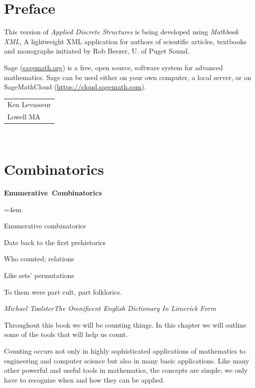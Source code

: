 \documentclass[10pt,]{book}
\theoremstyle{plain}
\theoremstyle{definition}
\theoremstyle{definition}
\theoremstyle{definition}
\newenvironment{poem}{\setlength{\parindent}{0em}}{}
\newcommand{\poemTitle}[1]{\begin{center}\large\textbf{#1}\end{center}}
\newenvironment{stanza}{\vspace{0.25 em}\hangindent=4em}{\vspace{1 em}}
\newcommand{\poemauthorleft}[1]{\vspace{-1em}\begin{flushleft}\textit{#1}\end{flushleft}}
\newcommand{\poemlineleft}[1]{{\raggedright{#1}\par}\vspace{-\parskip}}
\begin{document}
\chapter*{Preface}\label{preface-1}
This version of \emph{Applied Discrete Structures} is being developed using \emph{Mathbook XML}, A lightweight XML application for authors of scientific articles, textbooks and monographs initiated by Rob Beezer, U. of Puget Sound.  %
\par
Sage (\href{http://sagemath.org}{sagemath.org}) is a free, open source, software system for advanced mathematics.  Sage can be used either on your own computer, a local server, or on SageMathCloud (\href{https://cloud.sagemath.com}{https://cloud.sagemath.com}). %
\par\hfill\begin{tabular}{l@{}}
Ken Levasseur\\
Lowell MA
\end{tabular}\\\par
\setcounter{tocdepth}{1}
\renewcommand*\contentsname{Contents}
\tableofcontents
\mainmatter
\typeout{************************************************}
\typeout{************************************************}
\chapter[Combinatorics]{Combinatorics}\label{combinatorics}
\typeout{************************************************}
\typeout{************************************************}
\begin{poem}
\poemTitle{Enumerative Combinatorics}
\begin{stanza}
\poemlineleft{Enumerative combinatorics}
\poemlineleft{Date back to the first prehistorics}
\poemlineleft{Who counted; relations}
\poemlineleft{Like sets' permutations}
\poemlineleft{To them were part cult, part folklorics.}
\end{stanza}
\poemauthorleft{Michael ToalsterThe Omnificent English Dictionary In Limerick Form}
\end{poem}
Throughout this book we will be counting things. In this chapter we will outline some of the tools that will help us count.%
\par
Counting occurs not only in highly sophisticated applications of mathematics to engineering and computer science but also in many basic applications. Like many other powerful and useful tools in mathematics, the concepts are simple; we only have to recognize when and how they can be applied.
%
\typeout{************************************************}
\typeout{************************************************}
\end{document}
